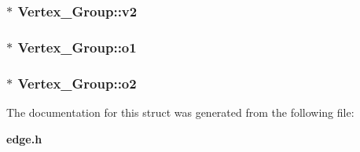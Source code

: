 \subsubsection{ $\ast$ {\bf Vertex\_\-Group::v2}}\label{structVertex__Group_a9308691e365e00b50d3c4c3615eccb3}


\subsubsection{ $\ast$ {\bf Vertex\_\-Group::o1}}\label{structVertex__Group_43d8b980e89c20dc2ab08099a2163fb0}


\subsubsection{ $\ast$ {\bf Vertex\_\-Group::o2}}\label{structVertex__Group_026b6ac87b992aa3aa615902de151b6e}




The documentation for this struct was generated from the following file:\begin{CompactItemize}
\item 
{\bf edge.h}\end{CompactItemize}
